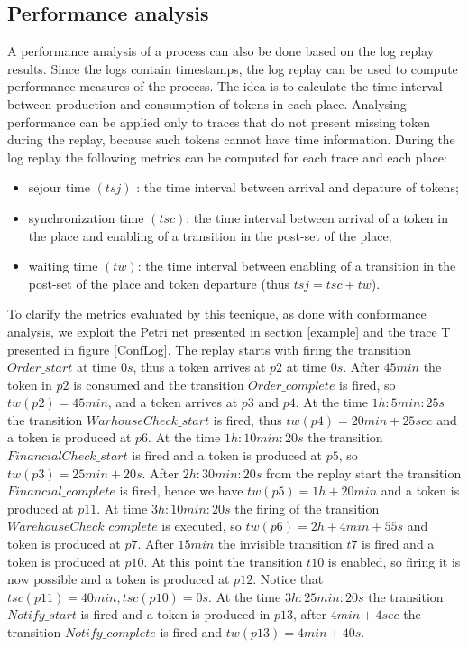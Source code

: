 \documentclass{llncs}
\begin{document}
\subsection{Performance analysis}
A performance analysis of a process can also be done based on the log replay results. Since the logs contain timestamps, the log replay can be used to compute performance measures of the process. The idea is to calculate the time interval between production and consumption of tokens in each place. Analysing performance can be applied only to traces that do not present missing token during the replay, because such tokens cannot have time information. During the log replay the following metrics can be computed for each trace and each place:
\begin{itemize}
\item sejour time $(tsj)$ : the time interval between arrival and depature of tokens;
\item synchronization time $(tsc)$: the time interval between arrival of a token in the place and enabling of a transition in the post-set of the place;
\item waiting time $(tw)$:  the time interval between enabling of a transition in the post-set of the place and token departure (thus $tsj=tsc+tw $).
\end{itemize}

To clarify the metrics evaluated by this tecnique, as done with conformance analysis, we exploit the Petri net  presented in section \ref{example} and the trace T presented in figure \ref{ConfLog}. The replay starts with firing the transition $Order\_start$ at time $0s$, thus a token arrives at $p2$ at time $0s$. After $45 min$ the token in $p2$ is consumed and the transition $Order\_complete$ is fired, so $tw(p2)=45min$, and a token arrives at $p3$ and $p4$. At the time $1h:5min:25s$ the transition $WarhouseCheck\_start$ is fired, thus $tw(p4)=20min+25sec$ and a token is produced at $p6$. At the time $1h:10min:20s$ the transition $FinancialCheck\_start$ is fired and a token is produced at $p5$, so $tw(p3)=25min+20s$. After $2h:30min:20s$ from the replay start the transition $Financial\_complete$ is fired, hence we have $tw(p5)=1h+20min$ and a token is produced at $p11$. At time $3h:10min:20s$ the firing of the transition $WarehouseCheck\_complete$ is executed, so $tw(p6)=2h+4min+55s$ and token is produced at $p7$. After $15 min$ the invisible transition $t7$ is fired and a token is produced at $p10$. At this point the transition $t10$ is enabled, so firing it is now possible and a token is produced at $p12$. Notice that $tsc(p11)=40min, tsc(p10)=0s$. At the time $3h:25min:20s$ the transition $Notify\_start$ is fired and a token is produced in $p13$, after $4min+4sec$ the transition $Notify\_complete$ is fired and $tw(p13) = 4min+40s$.\\
\end{document}
